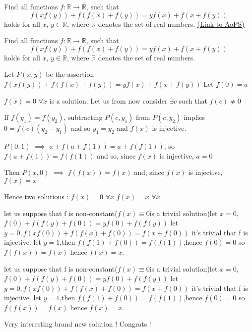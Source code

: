\begin{problem}
	Find all functions $ f: \mathbb{R} \to \mathbb{R}$, such that
\[ f(xf(y)) + f(f(x) + f(y)) = yf(x) + f(x + f(y))\]
holds for all $ x$, $ y \in \mathbb{R}$, where $ \mathbb{R}$ denotes the set of real numbers.
	\flushright \href{https://artofproblemsolving.com/community/c6h303622}{(Link to AoPS)}
\end{problem}



\begin{solution}
	\begin{tcolorbox}Find all functions $ f: \mathbb{R} \to \mathbb{R}$, such that
\[ f(xf(y)) + f(f(x) + f(y)) = yf(x) + f(x + f(y))\]
holds for all $ x$, $ y \in \mathbb{R}$, where $ \mathbb{R}$ denotes the set of real numbers.\end{tcolorbox}

Let $ P(x,y)$ be the assertion $ f(xf(y))+f(f(x)+f(y))=yf(x)+f(x+f(y))$
Let $ f(0)=a$

$ f(x)=0$ $ \forall x$ is a solution. Let us from now consider $ \exists c$ such that $ f(c)\neq 0$

If $ f(y_1)=f(y_2)$, subtracting $ P(c,y_1)$ from $ P(c,y_2)$ implies $ 0=f(c)(y_2-y_1)$ and so $ y_1=y_2$ and $ f(x)$ is injective.

$ P(0,1)$ $ \implies$ $ a+f(a+f(1))=a+f(f(1))$, so $ f(a+f(1))=f(f(1))$ and so, since $ f(x)$ is injective, $ a=0$

Then $ P(x,0)$ $ \implies$ $ f(f(x))=f(x)$ and, since $ f(x)$ is injective, $ f(x)=x$

Hence two solutions :
$ f(x)=0$ $ \forall x$
$ f(x)=x$ $ \forall x$
\end{solution}



\begin{solution}
	let us suppose that f is non-constant($f(x)\equiv 0 $is a trivial solution)let $x=0$,$f(0)+f(f(y)+f(0))=yf(0)+f(f(y))$
let $y=0,f(xf(0))+f(f(x)+f(0))=f(x+f(0))$
it's trivial that f is injective.
let $y=1$,then $f(f(1)+f(0))=f(f(1))$,hence $f(0)=0$
so $f(f(x))=f(x)$ hence $f(x)=x$.
\end{solution}



\begin{solution}
	\begin{tcolorbox}let us suppose that f is non-constant($f(x)\equiv 0 $is a trivial solution)let $x=0$,$f(0)+f(f(y)+f(0))=yf(0)+f(f(y))$
let $y=0,f(xf(0))+f(f(x)+f(0))=f(x+f(0))$
it's trivial that f is injective.
let $y=1$,then $f(f(1)+f(0))=f(f(1))$,hence $f(0)=0$
so $f(f(x))=f(x)$ hence $f(x)=x$.\end{tcolorbox}
Very interesting brand new solution !
Congrats !
\end{solution}



